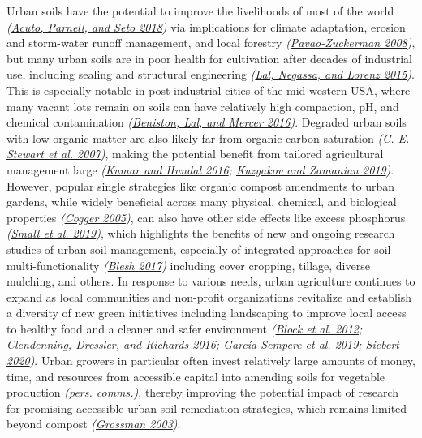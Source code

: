 \documentclass[
  12pt,
]{article}
\begin{document}
Urban soils have the potential to improve the livelihoods of most of the world \emph{(\protect\hyperlink{ref-acuto18}{Acuto, Parnell, and Seto 2018})} via implications for climate adaptation, erosion and storm-water runoff management, and local forestry \emph{(\protect\hyperlink{ref-pavao-zuckerman08}{Pavao-Zuckerman 2008})}, but many urban soils are in poor health for cultivation after decades of industrial use, including sealing and structural engineering \emph{(\protect\hyperlink{ref-lal15}{Lal, Negassa, and Lorenz 2015})}.
This is especially notable in post-industrial cities of the mid-western USA, where many vacant lots remain on soils can have relatively high compaction, pH, and chemical contamination \emph{(\protect\hyperlink{ref-beniston16}{Beniston, Lal, and Mercer 2016})}.
Degraded urban soils with low organic matter are also likely far from organic carbon saturation \emph{(\protect\hyperlink{ref-stewart07}{C. E. Stewart et al. 2007})}, making the potential benefit from tailored agricultural management large \emph{(\protect\hyperlink{ref-kumar16}{Kumar and Hundal 2016}; \protect\hyperlink{ref-kuzyakov19}{Kuzyakov and Zamanian 2019})}.
However, popular single strategies like organic compost amendments to urban gardens, while widely beneficial across many physical, chemical, and biological properties \emph{(\protect\hyperlink{ref-cogger05}{Cogger 2005})}, can also have other side effects like excess phosphorus \emph{(\protect\hyperlink{ref-small19}{Small et al. 2019})}, which highlights the benefits of new and ongoing research studies of urban soil management, especially of integrated approaches for soil multi-functionality \emph{(\protect\hyperlink{ref-blesh17}{Blesh 2017})} including cover cropping, tillage, diverse mulching, and others.
In response to various needs, urban agriculture continues to expand as local communities and non-profit organizations revitalize and establish a diversity of new green initiatives including landscaping to improve local access to healthy food and a cleaner and safer environment \emph{(\protect\hyperlink{ref-block12}{Block et al. 2012}; \protect\hyperlink{ref-clendenning16}{Clendenning, Dressler, and Richards 2016}; \protect\hyperlink{ref-garcia-sempere19}{García-Sempere et al. 2019}; \protect\hyperlink{ref-siebert20}{Siebert 2020})}.
Urban growers in particular often invest relatively large amounts of money, time, and resources from accessible capital into amending soils for vegetable production \emph{(pers. comms.)},
thereby improving the potential impact of research for promising accessible urban soil remediation strategies, which remains limited beyond compost \emph{(\protect\hyperlink{ref-grossman03}{Grossman 2003})}.
\end{document}
